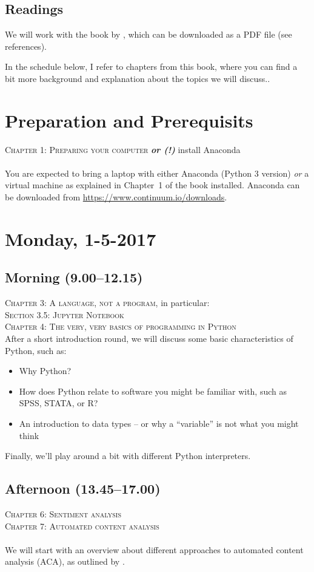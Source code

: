 \documentclass[a4paper,12pt]{report}
\begin{document}
\subsection*{Readings}
We will work with the book by \cite{Trilling2016}, which can be downloaded as a PDF file (see references).


In the schedule below, I refer to chapters from this book, where you can find a bit more background and explanation about the topics we will discuss..


\section*{Preparation and Prerequisits}
\textsc{ Chapter 1: Preparing your computer} \textbf{\emph{or (!)}} install Anaconda\\
~\\
You are expected to bring a laptop with either Anaconda (Python 3 version) \emph{or} a virtual machine as explained in Chapter~1 of the book installed. Anaconda can be downloaded from  \url{https://www.continuum.io/downloads}.



\section*{Monday, 1-5-2017}
\subsection*{Morning (9.00--12.15)}
\textsc{ Chapter 3: A language, not a program}, in particular: \\ \textsc{ Section 3.5: Jupyter Notebook} \\
\textsc{ Chapter 4: The very, very basics of programming in Python}
~\\
After a short introduction round, we will discuss some basic characteristics of Python, such as:
\begin{itemize}
	\item Why Python?
	\item How does Python relate to software you might be familiar with, such as SPSS, STATA, or R?
	\item An introduction to data types -- or why a ``variable'' is not what you might think
\end{itemize}
Finally, we'll play around a bit with different Python interpreters.


\subsection*{Afternoon (13.45--17.00)}
\textsc{ Chapter 6: Sentiment analysis}\\
\textsc{ Chapter 7: Automated content analysis}\\
~\\
We will start with an overview about different approaches to automated content analysis (ACA), as outlined by \cite{Boumans2016}. 
\end{document}
